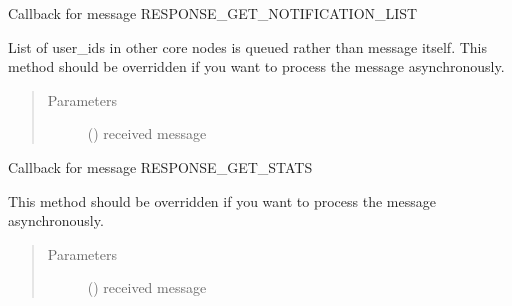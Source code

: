 \documentclass[letterpaper,10pt,english]{sphinxmanual}
\begin{document}
\begin{fulllineitems}
\begin{fulllineitems}
\begin{quote}
\begin{description}
\end{description}\end{quote}

\end{fulllineitems}


\begin{fulllineitems}
\label{\detokenize{bbc1.core.bbc_app:bbc1.core.bbc_app.Callback.proc_resp_get_notificationlist}}
Callback for message RESPONSE\_GET\_NOTIFICATION\_LIST

List of user\_ids in other core nodes is queued rather than message itself.
This method should be overridden if you want to process the message asynchronously.
\begin{quote}\begin{description}
\item[{Parameters}] \leavevmode
{} () \textendash{} received message

\end{description}\end{quote}

\end{fulllineitems}


\begin{fulllineitems}
\label{\detokenize{bbc1.core.bbc_app:bbc1.core.bbc_app.Callback.proc_resp_get_stats}}
Callback for message RESPONSE\_GET\_STATS

This method should be overridden if you want to process the message asynchronously.
\begin{quote}\begin{description}
\item[{Parameters}] \leavevmode
{} () \textendash{} received message

\end{description}\end{quote}

\end{fulllineitems}


\end{fulllineitems}
\end{document}
